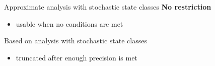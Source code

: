   \begin{frame}{Approximate analysis with stochastic state classes}
    \textbf{No restriction}
    \begin{itemize}
      \item usable when no conditions are met
    \end{itemize}
    
    \begin{center}\scalebox{0.7}{}\end{center}
    
    Based on analysis with stochastic state classes
    \begin{itemize}
      \item truncated after enough precision is met
    \end{itemize}
  \end{frame}

